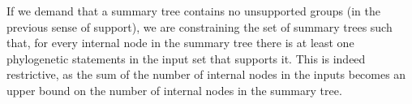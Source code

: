 \documentclass[11pt]{article}
\newcommand{\pss}{phylogenetic statements\xspace}
\begin{document}
If we demand that a summary tree contains no unsupported groups (in the previous sense of support), we 
    are constraining the set of summary trees such that, for every internal node in the summary tree
    there is at least one \pss in the input set that supports it.
This is indeed restrictive, as the sum of the number of internal nodes in the inputs becomes an upper bound
    on the number of internal nodes in the summary tree.




\end{document}
